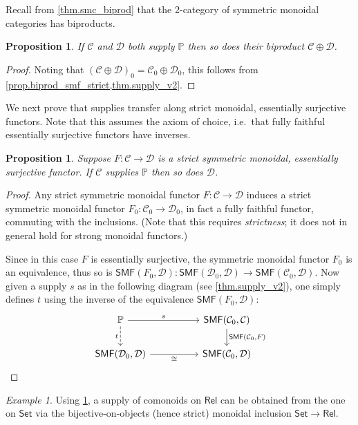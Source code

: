 \documentclass[11pt, oneside, article]{memoir}
\theoremstyle{plain}
\newtheorem{proposition}[theorem]{Proposition}
\theoremstyle{definition}
\theoremstyle{remark}
\newtheorem{example}[theorem]{Example}
\newcommand{\cat}[1]{\mathcal{#1}}%
\newcommand{\Cat}[1]{{\mathsf{#1}}}%
\newcommand{\smset}{\Cat{Set}}
\newcommand{\smf}{\Cat{SMF}}
\newcommand{\pp}{\mathbb{P}}
\newcommand{\mob}[1]{#1_0}
\newcommand{\rel}{\Cat{Rel}}
\begin{document}
Recall from \cref{thm.smc_biprod} that the 2-category of symmetric monoidal categories has biproducts.

\begin{proposition}
If $\cat{C}$ and $\cat{D}$ both supply $\pp$ then so does their biproduct $\cat{C}\oplus\cat{D}$.
\end{proposition}
\begin{proof}
Noting that $\mob{(\cat{C}\oplus \cat{D})} =\mob{\cat{C}} \oplus \mob{\cat{D}}$, this follows from \cref{prop.biprod_smf_strict,thm.supply_v2}.
\end{proof}

We next prove that supplies transfer along strict monoidal, essentially surjective functors. Note that this assumes the axiom of choice, i.e.\ that fully faithful essentially surjective functors have inverses.

\begin{proposition}\label{cor.strong_bo}
Suppose $F\colon\cat{C}\to\cat{D}$ is a strict symmetric monoidal, essentially surjective functor. If $\cat{C}$ supplies $\pp$ then so does $\cat{D}$.
\end{proposition}
\begin{proof}
Any strict symmetric monoidal functor $F\colon\cat{C}\to\cat{D}$ induces a strict symmetric monoidal functor $\mob{F}\colon\mob{\cat{C}}\to\mob{\cat{D}}$, in fact a fully faithful functor, commuting with the inclusions. (Note that this requires \emph{strictness}; it does not in general hold for strong monoidal functors.) 

Since in this case $F$ is essentially surjective, the symmetric monoidal functor $\mob{F}$ is an equivalence, thus so is $\smf(\mob{F},\cat{D})\colon\smf(\mob{\cat{D}},\cat{D})\to\smf(\mob{\cat{C}},\cat{D})$. Now given a supply $s$ as in the following diagram (see \cref{thm.supply_v2}), one simply defines $t$ using the inverse of the equivalence $\smf(\mob{F},\cat{D})$:
\[
\begin{tikzcd}[column sep=50pt,baseline=(W.base)]
	\pp\ar[r, "s"]\ar[d, dashed, "t"']&
	\smf(\mob{\cat{C}},\cat{C})\ar[d, "{\smf(\mob{\cat{C}},F)}"]\\
	\smf(\mob{\cat{D}},\cat{D})\ar[r, "\cong"']& |[alias=W]|
	\smf(\mob{\cat{C}},\cat{D})
\end{tikzcd}
\qedhere
\]
\end{proof}

\begin{example}
Using \cref{cor.strong_bo}, a supply of comonoids on $\rel$ can be obtained from the one on $\smset$ via the bijective-on-objects (hence strict) monoidal inclusion $\smset\to\rel$.
\end{example}
\end{document}
